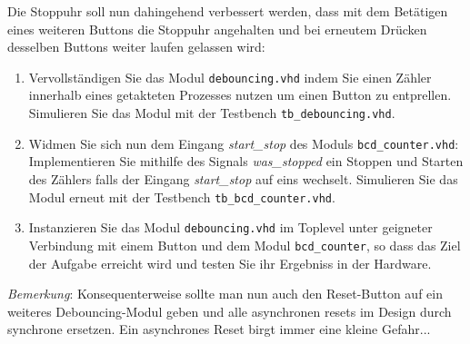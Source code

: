 \documentclass[12pt]{article}
\begin{document}


Die Stoppuhr soll nun dahingehend verbessert werden, dass mit dem Betätigen eines weiteren Buttons die Stoppuhr angehalten und bei erneutem Drücken desselben Buttons weiter laufen gelassen wird:


\begin{enumerate}[label=\alph*.)]


\item Vervollständigen Sie das Modul \texttt{debouncing.vhd} indem Sie einen Zähler innerhalb eines getakteten Prozesses nutzen um einen Button zu entprellen. Simulieren Sie das Modul mit der Testbench \texttt{tb\_debouncing.vhd}.


\item Widmen Sie sich nun dem Eingang \textit{start\_stop} des Moduls \texttt{bcd\_counter.vhd}:\\
Implementieren Sie mithilfe des Signals \textit{was\_stopped} ein Stoppen und Starten des Zählers falls der Eingang \textit{start\_stop} auf eins wechselt. Simulieren Sie das Modul erneut mit der Testbench \texttt{tb\_bcd\_counter.vhd}.


\item Instanzieren Sie das Modul \texttt{debouncing.vhd} im Toplevel unter geigneter Verbindung mit einem Button und dem Modul \texttt{bcd\_counter}, so dass das Ziel der Aufgabe erreicht wird und testen Sie ihr Ergebniss in der Hardware.


\end{enumerate}


\textit{Bemerkung}: Konsequenterweise sollte man nun auch den Reset-Button auf ein weiteres Debouncing-Modul geben und alle asynchronen resets im Design durch synchrone ersetzen. Ein asynchrones Reset birgt immer eine kleine Gefahr...
\end{document}
